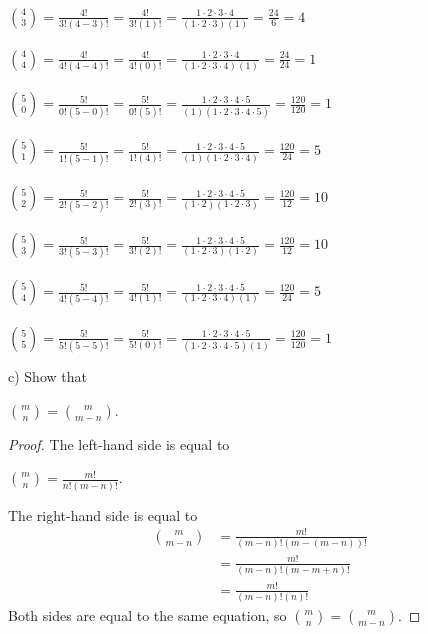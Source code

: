 \documentclass[12pt]{article}
\begin{document}
\begin{center}
~ \\
$\displaystyle \binom{4}{3}=\displaystyle \frac{4!}{3!(4-3)!}=\displaystyle \frac{4!}{3!(1)!}=\displaystyle \frac{1\cdot2\cdot3\cdot4}{(1\cdot2\cdot3)(1)}=\displaystyle \frac{24}{6}=4$ \\
~ \\
$\displaystyle \binom{4}{4}=\displaystyle \frac{4!}{4!(4-4)!}=\displaystyle \frac{4!}{4!(0)!}=\displaystyle \frac{1\cdot2\cdot3\cdot4}{(1\cdot2\cdot3\cdot4)(1)}=\displaystyle \frac{24}{24}=1$ \\
~ \\
$\displaystyle \binom{5}{0}=\displaystyle \frac{5!}{0!(5-0)!}=\displaystyle \frac{5!}{0!(5)!}=\displaystyle \frac{1\cdot2\cdot3\cdot4\cdot5}{(1)(1\cdot2\cdot3\cdot4\cdot5)}=\displaystyle \frac{120}{120}=1$ \\
~ \\
$\displaystyle \binom{5}{1}=\displaystyle \frac{5!}{1!(5-1)!}=\displaystyle \frac{5!}{1!(4)!}=\displaystyle \frac{1\cdot2\cdot3\cdot4\cdot5}{(1)(1\cdot2\cdot3\cdot4)}=\displaystyle \frac{120}{24}=5$ \\
~ \\
$\displaystyle \binom{5}{2}=\displaystyle \frac{5!}{2!(5-2)!}=\displaystyle \frac{5!}{2!(3)!}=\displaystyle \frac{1\cdot2\cdot3\cdot4\cdot5}{(1\cdot2)(1\cdot2\cdot3)}=\displaystyle \frac{120}{12}=10$ \\
~ \\
$\displaystyle \binom{5}{3}=\displaystyle \frac{5!}{3!(5-3)!}=\displaystyle \frac{5!}{3!(2)!}=\displaystyle \frac{1\cdot2\cdot3\cdot4\cdot5}{(1\cdot2\cdot3)(1\cdot2)}=\displaystyle \frac{120}{12}=10$ \\
~ \\
$\displaystyle \binom{5}{4}=\displaystyle \frac{5!}{4!(5-4)!}=\displaystyle \frac{5!}{4!(1)!}=\displaystyle \frac{1\cdot2\cdot3\cdot4\cdot5}{(1\cdot2\cdot3\cdot4)(1)}=\displaystyle \frac{120}{24}=5$ \\
~ \\
$\displaystyle \binom{5}{5}=\displaystyle \frac{5!}{5!(5-5)!}=\displaystyle \frac{5!}{5!(0)!}=\displaystyle \frac{1\cdot2\cdot3\cdot4\cdot5}{(1\cdot2\cdot3\cdot4\cdot5)(1)}=\displaystyle \frac{120}{120}=1$ \\
\end{center}
c) Show that
\begin{center}
$\displaystyle \binom{m}{n}=\displaystyle \binom{m}{m-n}$.
\end{center}
\begin{proof}
The left-hand side is equal to
\begin{center}
$\displaystyle \binom{m}{n}=\displaystyle \frac{m!}{n!(m-n)!}$.
\end{center}
The right-hand side is equal to
\begin{align*}
\displaystyle \binom{m}{m-n}&=\displaystyle \frac{m!}{(m-n)!(m-(m-n))!} \\
&=\displaystyle \frac{m!}{(m-n)!(m-m+n)!} \\
&=\displaystyle \frac{m!}{(m-n)!(n)!}
\end{align*}
Both sides are equal to the same equation, so $\displaystyle \binom{m}{n}=\displaystyle \binom{m}{m-n}$.
\end{proof}
\end{document}
